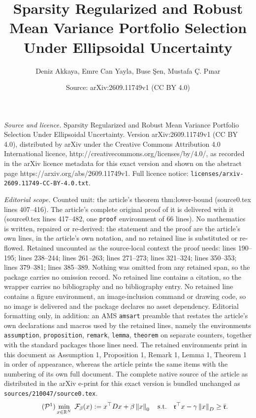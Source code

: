 \documentclass[10pt,a4paper]{amsart}
\title{Sparsity Regularized and Robust Mean Variance Portfolio Selection Under Ellipsoidal Uncertainty}
\author{Deniz Akkaya, Emre Can Yayla, Buse \c{S}en, Mustafa \c{C}. P{\i}nar}
\date{Source: arXiv:2609.11749v1 (CC BY 4.0)}
\newcommand{\RR}{{\mathbb R}} %
\newcommand{\cF}{{\mathcal F}}
\newcommand{\cP}{{\mathcal P}}
\newcommand{\ccr}{{\mathfrak r}}
\newcommand{\norm}[1]{\left\lVert#1\right\rVert}
\newcommand{\tpose}[1]{#1^{\top}}
\begin{document}
\maketitle

\noindent\emph{Source and licence.} Sparsity Regularized and Robust Mean Variance Portfolio Selection Under Ellipsoidal Uncertainty. Version arXiv:2609.11749v1 (CC BY 4.0), distributed by arXiv under the Creative Commons Attribution 4.0 International licence, http://creativecommons.org/licenses/by/4.0/, as recorded in the arXiv licence metadata for this exact version and shown on the abstract page https://arxiv.org/abs/2609.11749v1. Full licence notice: \texttt{licenses/arxiv-2609.11749-CC-BY-4.0.txt}.\par\smallskip

\noindent\textit{Editorial scope.} Counted unit: the article's theorem thm:lower-bound (source0.tex lines 407--416). The article's complete original proof of it is delivered with it (source0.tex lines 417--482, one \texttt{proof} environment of 66 lines). No mathematics is written, repaired or re-derived: the statement and the proof are the article's own lines, in the article's own notation, and no retained line is substituted or re-flowed.  Retained uncounted as the source-local context the proof needs: lines 190--195; lines 238--244; lines 261--263; lines 271--273; lines 321--324; lines 350--353; lines 379--381; lines 385--389.  Nothing was omitted from any retained span, so the package carries no omission record.  No retained line contains a citation, so the wrapper carries no bibliography and no bibliography entry.  No retained line contains a figure environment, an image-inclusion command or drawing code, so no image is delivered and the package declares no asset dependency.  Editorial formatting only, in addition: an AMS \texttt{amsart} preamble that restates the article's own declarations and macros used by the retained lines, namely the environments \texttt{assumption}, \texttt{proposition}, \texttt{remark}, \texttt{lemma}, \texttt{theorem} on separate counters, together with the standard packages those lines need.  The retained environments print in this document as Assumption 1, Proposition 1, Remark 1, Lemma 1, Theorem 1 in order of appearance, whereas the article prints the same items with the numbering of its own full document.  The complete native source of the article as distributed in the arXiv e-print for this exact version is bundled unchanged as \texttt{sources/210047/source0.tex}.
\begin{align}
\tag{$\cP^1$}\label{prob:cprmvp}
\min_{x\in\RR^N} \; \cF_\beta(x):= \tpose{x} D x + \beta \norm{x}_0
\quad \text{s.t.} \quad
\tpose{\ccr} x - \gamma \norm{x}_D \ge \bar{\ccr}.
\end{align}
\end{document}
